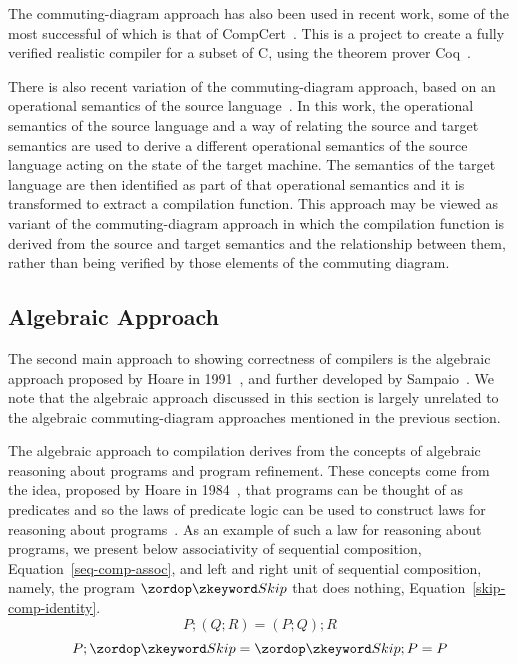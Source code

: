 The commuting-diagram approach has also been used in recent work, some of the
most successful of which is that of CompCert~\cite{leroy2009a,
  leroy2009b, leroy2012}.
This is a project to create a fully verified realistic compiler for a
subset of C, using the theorem prover Coq~\cite{coq2004}.

There is also recent variation of the commuting-diagram approach, 
based on an operational semantics of the source
language~\cite{bahr2015}.
In this work, the operational semantics of the source language and
a way of relating the source and target semantics are used to derive a
different operational semantics of the source language acting on the
state of the target machine.
The semantics of the target language are then identified as part of
that operational semantics and it is transformed to extract a
compilation function.
This approach may be viewed as variant of the commuting-diagram
approach in which the compilation function is derived from the source
and target semantics and the relationship between them, rather than
being verified by those elements of the commuting diagram.

\subsection{Algebraic Approach}
\label{algebraic-approach-subsection}

The second main approach to showing correctness of compilers is the
algebraic approach proposed by Hoare in 1991~\cite{hoare1991}, and
further developed by Sampaio~\cite{hoare1993, sampaio1993,
  sampaio1997}.
We note that the algebraic approach discussed in this section is
largely unrelated to the algebraic commuting-diagram approaches
mentioned in the previous section.

The algebraic approach to compilation derives from the concepts of
algebraic reasoning about programs and program refinement.
These concepts come from the idea, proposed by Hoare in
1984~\cite{hoare1984}, that programs can be thought of as predicates
and so the laws of predicate logic can be used to construct laws for
reasoning about programs~\cite{hoare1987}.
As an example of such a law for reasoning about programs, we present
below associativity of sequential composition,
Equation~\eqref{seq-comp-assoc}, and left and right unit of sequential
composition, namely, the program $\Skip$ that does nothing,
Equation~\eqref{skip-comp-identity}.
\begin{equation}
  \label{seq-comp-assoc}
  P;(Q;R) = (P;Q);R
\end{equation}
\begin{equation}
  \label{skip-comp-identity}
  P;\Skip = \Skip;P = P
\end{equation}

